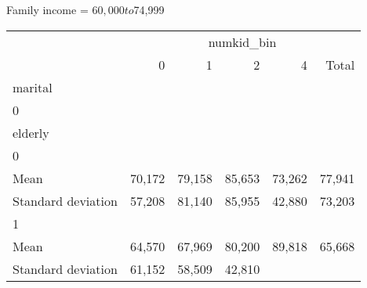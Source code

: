 Family income = $60,000 to $74,999
\begin{tabular}{llllll}
\cline{1-6}
\multicolumn{1}{c}{} &
  \multicolumn{5}{|c}{numkid\_bin} \\
\multicolumn{1}{c}{} &
  \multicolumn{1}{|r}{0} &
  \multicolumn{1}{r}{1} &
  \multicolumn{1}{r}{2} &
  \multicolumn{1}{r}{4} &
  \multicolumn{1}{r}{Total} \\
\cline{1-6}
\multicolumn{1}{l}{marital} &
  \multicolumn{1}{|r}{} &
  \multicolumn{1}{r}{} &
  \multicolumn{1}{r}{} &
  \multicolumn{1}{r}{} &
  \multicolumn{1}{r}{} \\
\multicolumn{1}{l}{\hspace{1em}0} &
  \multicolumn{1}{|r}{} &
  \multicolumn{1}{r}{} &
  \multicolumn{1}{r}{} &
  \multicolumn{1}{r}{} &
  \multicolumn{1}{r}{} \\
\multicolumn{1}{l}{\hspace{2em}elderly} &
  \multicolumn{1}{|r}{} &
  \multicolumn{1}{r}{} &
  \multicolumn{1}{r}{} &
  \multicolumn{1}{r}{} &
  \multicolumn{1}{r}{} \\
\multicolumn{1}{l}{\hspace{3em}0} &
  \multicolumn{1}{|r}{} &
  \multicolumn{1}{r}{} &
  \multicolumn{1}{r}{} &
  \multicolumn{1}{r}{} &
  \multicolumn{1}{r}{} \\
\multicolumn{1}{l}{\hspace{4em}Mean} &
  \multicolumn{1}{|r}{70,172} &
  \multicolumn{1}{r}{79,158} &
  \multicolumn{1}{r}{85,653} &
  \multicolumn{1}{r}{73,262} &
  \multicolumn{1}{r}{77,941} \\
\multicolumn{1}{l}{\hspace{4em}Standard deviation} &
  \multicolumn{1}{|r}{57,208} &
  \multicolumn{1}{r}{81,140} &
  \multicolumn{1}{r}{85,955} &
  \multicolumn{1}{r}{42,880} &
  \multicolumn{1}{r}{73,203} \\
\multicolumn{1}{l}{\hspace{3em}1} &
  \multicolumn{1}{|r}{} &
  \multicolumn{1}{r}{} &
  \multicolumn{1}{r}{} &
  \multicolumn{1}{r}{} &
  \multicolumn{1}{r}{} \\
\multicolumn{1}{l}{\hspace{4em}Mean} &
  \multicolumn{1}{|r}{64,570} &
  \multicolumn{1}{r}{67,969} &
  \multicolumn{1}{r}{80,200} &
  \multicolumn{1}{r}{89,818} &
  \multicolumn{1}{r}{65,668} \\
\multicolumn{1}{l}{\hspace{4em}Standard deviation} &
  \multicolumn{1}{|r}{61,152} &
  \multicolumn{1}{r}{58,509} &
  \multicolumn{1}{r}{42,810} &

\end{tabular}
